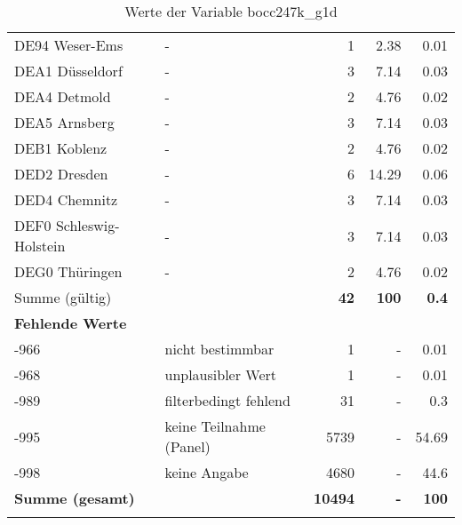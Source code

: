 \begin{longtable}{Xlrrr}
        \multicolumn{1}{X}{DE94 Weser-Ems} & - & \num{1} & \num[round-mode=places,round-precision=2]{2.38} & \num[round-mode=places,round-precision=2]{0.01} \\
        \multicolumn{1}{X}{DEA1 Düsseldorf} & - & \num{3} & \num[round-mode=places,round-precision=2]{7.14} & \num[round-mode=places,round-precision=2]{0.03} \\
        \multicolumn{1}{X}{DEA4 Detmold} & - & \num{2} & \num[round-mode=places,round-precision=2]{4.76} & \num[round-mode=places,round-precision=2]{0.02} \\
        \multicolumn{1}{X}{DEA5 Arnsberg} & - & \num{3} & \num[round-mode=places,round-precision=2]{7.14} & \num[round-mode=places,round-precision=2]{0.03} \\
        \multicolumn{1}{X}{DEB1 Koblenz} & - & \num{2} & \num[round-mode=places,round-precision=2]{4.76} & \num[round-mode=places,round-precision=2]{0.02} \\
        \multicolumn{1}{X}{DED2 Dresden} & - & \num{6} & \num[round-mode=places,round-precision=2]{14.29} & \num[round-mode=places,round-precision=2]{0.06} \\
        \multicolumn{1}{X}{DED4 Chemnitz} & - & \num{3} & \num[round-mode=places,round-precision=2]{7.14} & \num[round-mode=places,round-precision=2]{0.03} \\
        \multicolumn{1}{X}{DEF0 Schleswig-Holstein} & - & \num{3} & \num[round-mode=places,round-precision=2]{7.14} & \num[round-mode=places,round-precision=2]{0.03} \\
        \multicolumn{1}{X}{DEG0 Thüringen} & - & \num{2} & \num[round-mode=places,round-precision=2]{4.76} & \num[round-mode=places,round-precision=2]{0.02} \\
     \midrule
      \multicolumn{2}{l}{Summe (gültig)} & \textbf{\num{42}} &
      \textbf{\num{100}} &
         \textbf{\num[round-mode=places,round-precision=2]{0.4}} \\
     \multicolumn{5}{l}{\textbf{Fehlende Werte}}\\
       -966 & nicht bestimmbar & \num{1} & - & \num[round-mode=places,round-precision=2]{0.01} \\

       -968 & unplausibler Wert & \num{1} & - & \num[round-mode=places,round-precision=2]{0.01} \\

       -989 & filterbedingt fehlend & \num{31} & - & \num[round-mode=places,round-precision=2]{0.3} \\

       -995 & keine Teilnahme (Panel) & \num{5739} & - & \num[round-mode=places,round-precision=2]{54.69} \\

       -998 & keine Angabe & \num{4680} & - & \num[round-mode=places,round-precision=2]{44.6} \\

     \midrule
     \multicolumn{2}{l}{\textbf{Summe (gesamt)}} & \textbf{\num{10494}} & \textbf{-} & \textbf{\num{100}} \\
     \bottomrule
     \caption{Werte der Variable bocc247k\_g1d}
     \end{longtable}
     
